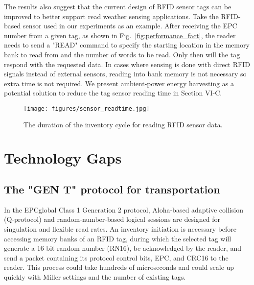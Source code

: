 \documentclass[lettersize,journal]{IEEEtran}
\begin{document}
The results also suggest that the current design of RFID sensor tags can be improved to better support read weather sensing applications. Take the RFID-based sensor used in our experiments as an example. After receiving the EPC number from a given tag, as shown in Fig.~\ref{fig:performance_fact}, the reader needs to send a "READ" command to specify the starting location in the memory bank to read from and the number of words to be read. Only then will the tag respond with the requested data. In cases where sensing is done with direct RFID signals instead of external sensors, reading into bank memory is not necessary so extra time is not required. We present ambient-power energy harvesting as a potential solution to reduce the tag sensor reading time in Section VI-C.






\begin{figure}[tb!]
\centerline{\texttt{[image: figures/sensor\_readtime.jpg]}}
\caption{The duration of the inventory cycle for reading RFID sensor data.}
\label{fig:sensor_readtime}
\end{figure}


\section{Technology Gaps}
\subsection{The "GEN T" protocol for transportation}

In the EPCglobal Class 1 Generation 2 protocol, Aloha-based adaptive collision (Q-protocol) and random-number-based logical sessions are designed for singulation and flexible read rates. An inventory initiation is necessary before accessing memory banks of an RFID tag, during which the selected tag will generate a 16-bit random number (RN16), be acknowledged by the reader, and send a packet containing its protocol control bits, EPC, and CRC16 to the reader. This process could take hundreds of microseconds and could scale up quickly with Miller settings and the number of existing tags.
\end{document}
